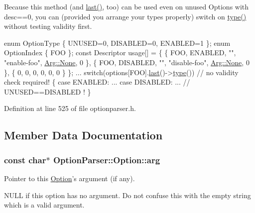 Because this method (and \hyperlink{class_option_parser_1_1_option_a4c500ad0071e1dc9be2b2b234db71b1d}{last()}, too) can be used even on unused Options with desc==0, you can (provided you arrange your types properly) switch on \hyperlink{class_option_parser_1_1_option_a957a9dab42de6de017ee655254b57a41}{type()} without testing validity first. 
\begin{DoxyCode}
\textcolor{keyword}{enum} OptionType \{ UNUSED=0, DISABLED=0, ENABLED=1 \};
\textcolor{keyword}{enum} OptionIndex \{ FOO \};
\textcolor{keyword}{const} Descriptor usage[] = \{
  \{ FOO, ENABLED,  \textcolor{stringliteral}{""}, \textcolor{stringliteral}{"enable-foo"},  \hyperlink{struct_option_parser_1_1_arg_afd9e5e7362e4accc619fe7dee7098956}{Arg::None}, 0 \},
  \{ FOO, DISABLED, \textcolor{stringliteral}{""}, \textcolor{stringliteral}{"disable-foo"}, \hyperlink{struct_option_parser_1_1_arg_afd9e5e7362e4accc619fe7dee7098956}{Arg::None}, 0 \},
  \{ 0, 0, 0, 0, 0, 0 \} \};
...
switch(options[FOO].\hyperlink{class_option_parser_1_1_option_a4c500ad0071e1dc9be2b2b234db71b1d}{last}()->\hyperlink{class_option_parser_1_1_option_a957a9dab42de6de017ee655254b57a41}{type}()) \textcolor{comment}{// no validity check required!}
\{
  \textcolor{keywordflow}{case} ENABLED: ...
  \textcolor{keywordflow}{case} DISABLED: ...  \textcolor{comment}{// UNUSED==DISABLED !}
\}
\end{DoxyCode}
 

Definition at line 525 of file optionparser.\-h.



\subsection{Member Data Documentation}
\hypertarget{class_option_parser_1_1_option_a5b222bff75241e025502aab20a914191}{
\subsubsection[{arg}]{\setlength{\rightskip}{0pt plus 5cm}const char$\ast$ Option\-Parser\-::\-Option\-::arg}}\label{class_option_parser_1_1_option_a5b222bff75241e025502aab20a914191}


Pointer to this \hyperlink{class_option_parser_1_1_option}{Option}'s argument (if any). 

N\-U\-L\-L if this option has no argument. Do not confuse this with the empty string which is a valid argument. 

